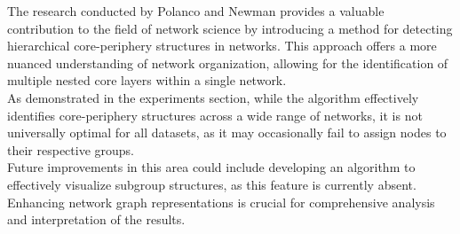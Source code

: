 \documentclass[sigconf]{acmart}
\begin{document}
The research conducted by Polanco and Newman \cite{hierarchical} provides a valuable contribution to the field of network science by introducing a method for detecting hierarchical core-periphery structures in networks. 
This approach offers a more nuanced understanding of network organization, allowing for the identification of multiple nested core layers within a single network. 
\\As demonstrated in the experiments section, while the algorithm effectively identifies core-periphery structures across a wide range of networks, it is not universally optimal for all datasets, as it may occasionally fail to assign nodes to their respective groups.
\\Future improvements in this area could include developing an algorithm to effectively visualize subgroup structures, as this feature is currently absent. Enhancing network graph representations is crucial for comprehensive analysis and interpretation of the results.
\begin{acks}
\end{acks}




\end{document}
